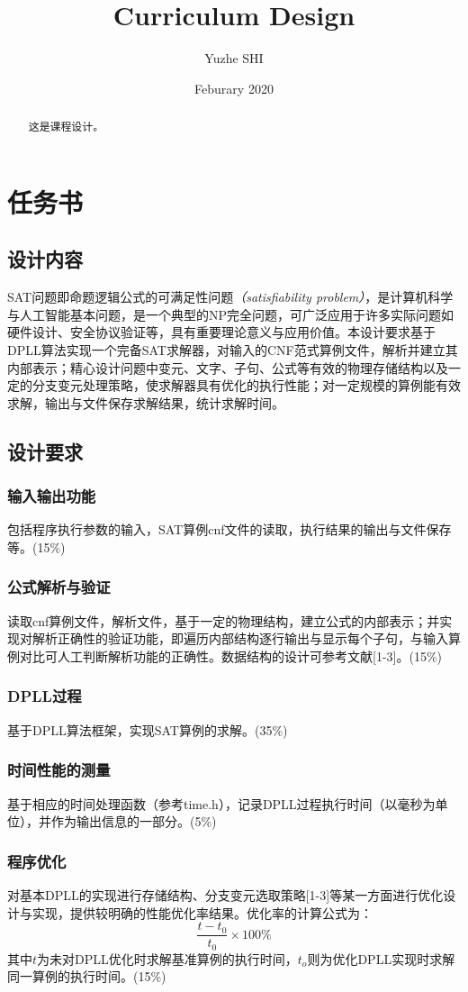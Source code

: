 \documentclass{ctexrep}
\title{Curriculum Design}
\author{Yuzhe SHI}
\date{Feburary 2020}
\begin{document}
\maketitle

  
\begin{abstract}
   这是课程设计。 
\end{abstract}
\tableofcontents
\chapter{任务书}
\section{设计内容}
SAT问题即命题逻辑公式的可满足性问题\textit{（satisfiability problem）}，是计算机科学与人工智能基本问题，是一个典型的NP完全问题，可广泛应用于许多实际问题如硬件设计、安全协议验证等，具有重要理论意义与应用价值。本设计要求基于DPLL算法实现一个完备SAT求解器，对输入的CNF范式算例文件，解析并建立其内部表示；精心设计问题中变元、文字、子句、公式等有效的物理存储结构以及一定的分支变元处理策略，使求解器具有优化的执行性能；对一定规模的算例能有效求解，输出与文件保存求解结果，统计求解时间。    
\section{设计要求}
\subsection{输入输出功能}
包括程序执行参数的输入，SAT算例cnf文件的读取，执行结果的输出与文件保存等。(15\%)
\subsection{公式解析与验证}
读取cnf算例文件，解析文件，基于一定的物理结构，建立公式的内部表示；并实现对解析正确性的验证功能，即遍历内部结构逐行输出与显示每个子句，与输入算例对比可人工判断解析功能的正确性。数据结构的设计可参考文献[1-3]。(15\%)
\subsection{DPLL过程}
基于DPLL算法框架，实现SAT算例的求解。(35\%)
\subsection{时间性能的测量}
基于相应的时间处理函数（参考time.h），记录DPLL过程执行时间（以毫秒为单位），并作为输出信息的一部分。(5\%)
\subsection{程序优化}
对基本DPLL的实现进行存储结构、分支变元选取策略[1-3]等某一方面进行优化设计与实现，提供较明确的性能优化率结果。优化率的计算公式为：
\begin{equation}
    \frac{t-t_0}{t_0}\times 100\%
\end{equation}
其中$t$为未对DPLL优化时求解基准算例的执行时间，$t_o$则为优化DPLL实现时求解同一算例的执行时间。(15\%)
\end{document}
